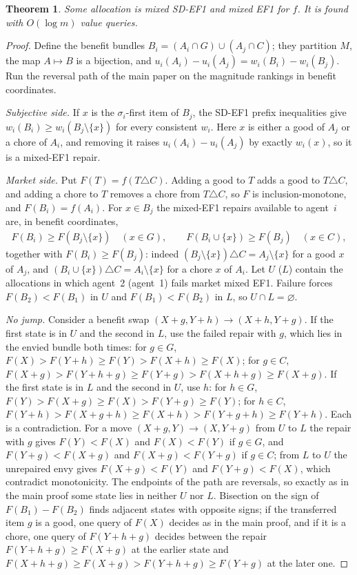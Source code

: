 \documentclass[11pt]{article}
\newtheorem{theorem}{Theorem}[section]
\theoremstyle{definition}
\begin{document}
\begin{theorem}\label{app:mixed}
Some allocation is mixed SD-EF1 and mixed EF1 for $f$. It is found with $O(\log m)$ value queries.
\end{theorem}
\begin{proof}
Define the benefit bundles $B_i=(A_i\cap G)\cup(A_j\cap C)$; they partition $M$, the map $A\mapsto B$ is a bijection, and $u_i(A_i)-u_i(A_j)=w_i(B_i)-w_i(B_j)$. Run the reversal path of the main paper on the magnitude rankings in benefit coordinates.

\emph{Subjective side.} If $x$ is the $\sigma_i$-first item of $B_j$, the SD-EF1 prefix inequalities give $w_i(B_i)\ge w_i(B_j\setminus\{x\})$ for every consistent $w_i$. Here $x$ is either a good of $A_j$ or a chore of $A_i$, and removing it raises $u_i(A_i)-u_i(A_j)$ by exactly $w_i(x)$, so it is a mixed-EF1 repair.

\emph{Market side.} Put $F(T)=f(T\triangle C)$. Adding a good to $T$ adds a good to $T\triangle C$, and adding a chore to $T$ removes a chore from $T\triangle C$, so $F$ is inclusion-monotone, and $F(B_i)=f(A_i)$. For $x\in B_j$ the mixed-EF1 repairs available to agent~$i$ are, in benefit coordinates,
\begin{gather*}
 F(B_i)\ge F(B_j\setminus\{x\})\quad(x\in G),\qquad F(B_i\cup\{x\})\ge F(B_j)\quad(x\in C),
\end{gather*}
together with $F(B_i)\ge F(B_j)$: indeed $(B_j\setminus\{x\})\triangle C=A_j\setminus\{x\}$ for a good $x$ of $A_j$, and $(B_i\cup\{x\})\triangle C=A_i\setminus\{x\}$ for a chore $x$ of $A_i$. Let $U$ ($L$) contain the allocations in which agent~2 (agent~1) fails market mixed EF1. Failure forces $F(B_2)<F(B_1)$ in $U$ and $F(B_1)<F(B_2)$ in $L$, so $U\cap L=\varnothing$.

\emph{No jump.} Consider a benefit swap $(X+g,Y+h)\to(X+h,Y+g)$. If the first state is in $U$ and the second in $L$, use the failed repair with $g$, which lies in the envied bundle both times: for $g\in G$, $F(X)>F(Y+h)\ge F(Y)>F(X+h)\ge F(X)$; for $g\in C$, $F(X+g)>F(Y+h+g)\ge F(Y+g)>F(X+h+g)\ge F(X+g)$. If the first state is in $L$ and the second in $U$, use $h$: for $h\in G$, $F(Y)>F(X+g)\ge F(X)>F(Y+g)\ge F(Y)$; for $h\in C$, $F(Y+h)>F(X+g+h)\ge F(X+h)>F(Y+g+h)\ge F(Y+h)$. Each is a contradiction. For a move $(X+g,Y)\to(X,Y+g)$ from $U$ to $L$ the repair with $g$ gives $F(Y)<F(X)$ and $F(X)<F(Y)$ if $g\in G$, and $F(Y+g)<F(X+g)$ and $F(X+g)<F(Y+g)$ if $g\in C$; from $L$ to $U$ the unrepaired envy gives $F(X+g)<F(Y)$ and $F(Y+g)<F(X)$, which contradict monotonicity. The endpoints of the path are reversals, so exactly as in the main proof some state lies in neither $U$ nor $L$. Bisection on the sign of $F(B_1)-F(B_2)$ finds adjacent states with opposite signs; if the transferred item $g$ is a good, one query of $F(X)$ decides as in the main proof, and if it is a chore, one query of $F(Y+h+g)$ decides between the repair $F(Y+h+g)\ge F(X+g)$ at the earlier state and $F(X+h+g)\ge F(X+g)>F(Y+h+g)\ge F(Y+g)$ at the later one.
\end{proof}
\end{document}
